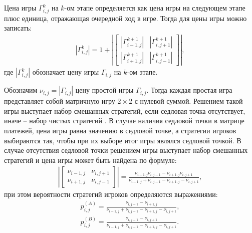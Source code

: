 Цена игры $\Gamma_{i,j}^{k}$ на $k$-ом этапе определяется как цена игры на следующем этапе плюс единица, отражающая очередной ход в игре. Тогда для цены игры можно записать:
\begin{equation}
    \begin{aligned}
        |\Gamma_{i,j}^{k}| = 1 + \left | \begin{bmatrix}
			|\Gamma_{i-1,j}^{k+1}| & |\Gamma_{i,j+1}^{k+1}| \\
			|\Gamma_{i+1,j}^{k+1}| & |\Gamma_{i,j-1}^{k+1}|
		\end{bmatrix} \right |,
    \label{eq:game-payments}
    \end{aligned}
\end{equation}
где $|\Gamma_{i,j}^k|$ обозначает цену игры $\Gamma_{i,j}$ на $k$-ом этапе.

Обозначим $\nu_{i,j}=|\Gamma_{i,j}|$ цену простой игры $\Gamma_{i,j}$. Тогда каждая простая игра представляет собой матричную игру $2\times2$ с нулевой суммой. Решением такой игры выступает набор смешанных стратегий, если седловая точка отсутствует, иначе -- набор чистых стратегий \cite{ouen_teoriya_1971}. В случае наличия седловой точки в матрице платежей, цена игры равна значению в седловой точке, а стратегии игроков выбираются так, чтобы при их выборе итог игры являлся седловой точкой. В случае отсутствия седловой точки решением игры выступает набор смешанных стратегий и цена игры может быть найдена по формуле:
\begin{equation}
    \begin{aligned}
        \left | \begin{bmatrix}
			\nu_{i-1,j} & \nu_{i,j+1} \\
			\nu_{i+1,j} & \nu_{i,j-1}
		\end{bmatrix} \right | = \frac{\nu_{i-1,j}\nu_{i,j-1} - \nu_{i+1,j}\nu_{i,j+1}}{\nu_{i-1,j} + \nu_{i,j-1} - \nu_{i+1,j} - \nu_{i,j+1}},
    \label{eq:game-2x2-value}
    \end{aligned}
\end{equation}
при этом вероятности стратегий игроков определяются выражениями:
\begin{equation}
    \begin{aligned}
        p_{i,j}^{(A)} = \frac{\nu_{i,j-1} - \nu_{i+1,j}}{\nu_{i-1,j} + \nu_{i,j-1} - \nu_{i+1,j} - \nu_{i,j+1}}, \\
        p_{i,j}^{(B)} = \frac{\nu_{i,j-1} - \nu_{i,j+1}}{\nu_{i-1,j} + \nu_{i,j-1} - \nu_{i+1,j} - \nu_{i,j+1}}.
    \label{eq:game-2x2-prob}
    \end{aligned}
\end{equation}

